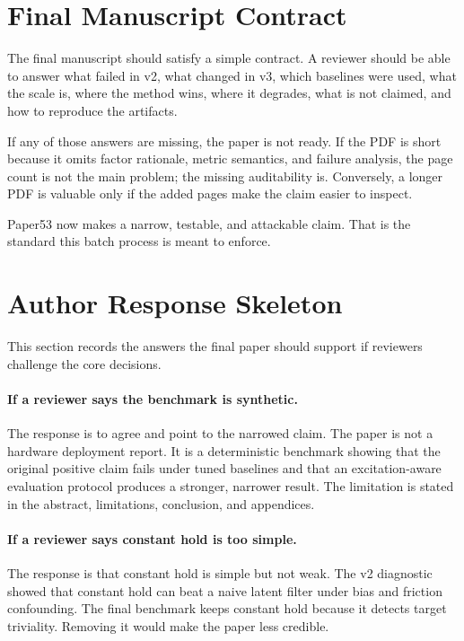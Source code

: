 \documentclass{article}
\begin{document}
\section{Final Manuscript Contract}

The final manuscript should satisfy a simple contract. A reviewer should be able to answer what failed in v2, what changed in v3, which baselines were used, what the scale is, where the method wins, where it degrades, what is not claimed, and how to reproduce the artifacts.

If any of those answers are missing, the paper is not ready. If the PDF is short because it omits factor rationale, metric semantics, and failure analysis, the page count is not the main problem; the missing auditability is. Conversely, a longer PDF is valuable only if the added pages make the claim easier to inspect.

Paper53 now makes a narrow, testable, and attackable claim. That is the standard this batch process is meant to enforce.

\section{Author Response Skeleton}

This section records the answers the final paper should support if reviewers challenge the core decisions.

\paragraph{If a reviewer says the benchmark is synthetic.}
The response is to agree and point to the narrowed claim. The paper is not a hardware deployment report. It is a deterministic benchmark showing that the original positive claim fails under tuned baselines and that an excitation-aware evaluation protocol produces a stronger, narrower result. The limitation is stated in the abstract, limitations, conclusion, and appendices.

\paragraph{If a reviewer says constant hold is too simple.}
The response is that constant hold is simple but not weak. The v2 diagnostic showed that constant hold can beat a naive latent filter under bias and friction confounding. The final benchmark keeps constant hold because it detects target triviality. Removing it would make the paper less credible.
\end{document}
